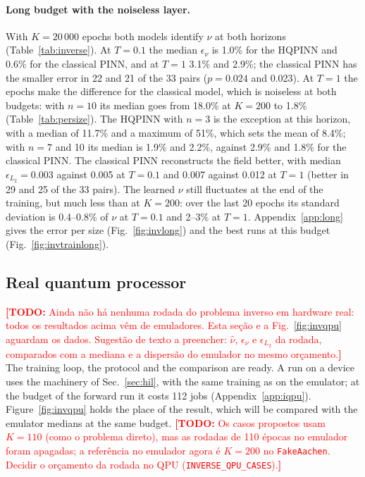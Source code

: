 \documentclass[floatfix,aps,pra,twocolumn,superscriptaddress,10pt,nofootinbib]{revtex4-2}
\newif\ifshowtodos \showtodostrue
\newcommand{\TODO}[1]{\ifshowtodos\textcolor{red}{\textbf{[TODO:} #1\textbf{]}}\fi}
\begin{document}
\paragraph{Long budget with the noiseless layer.} With $K=20\,000$ epochs both models identify $\nu$ at both horizons (Table~\ref{tab:inverse}). At $T=0.1$ the median $\epsilon_\nu$ is 1.0\% for the HQPINN and 0.6\% for the classical PINN, and at $T=1$ 3.1\% and 2.9\%; the classical PINN has the smaller error in 22 and 21 of the 33 pairs ($p=0.024$ and 0.023). At $T=1$ the epochs make the difference for the classical model, which is noiseless at both budgets: with $n=10$ its median goes from 18.0\% at $K=200$ to 1.8\% (Table~\ref{tab:persize}). The HQPINN with $n=3$ is the exception at this horizon, with a median of 11.7\% and a maximum of 51\%, which sets the mean of 8.4\%; with $n=7$ and 10 its median is 1.9\% and 2.2\%, against 2.9\% and 1.8\% for the classical PINN. The classical PINN reconstructs the field better, with median $\epsilon_{L_2}=0.003$ against 0.005 at $T=0.1$ and 0.007 against 0.012 at $T=1$ (better in 29 and 25 of the 33 pairs). The learned $\nu$ still fluctuates at the end of the training, but much less than at $K=200$: over the last 20 epochs its standard deviation is 0.4--0.8\% of $\nu$ at $T=0.1$ and 2--3\% at $T=1$. Appendix~\ref{app:long} gives the error per size (Fig.~\ref{fig:invlong}) and the best runs at this budget (Fig.~\ref{fig:invtrainlong}).

\subsection{Real quantum processor}\label{sec:i_qpu}
\TODO{Ainda n\~ao h\'a nenhuma rodada do problema inverso em hardware real: todos os resultados acima v\^em de emuladores. Esta se\c{c}\~ao e a Fig.~\ref{fig:invqpu} aguardam os dados. Sugest\~ao de texto a preencher: $\hat\nu$, $\epsilon_\nu$ e $\epsilon_{L_2}$ da rodada, comparados com a mediana e a dispers\~ao do emulador no mesmo or\c{c}amento.}
The training loop, the protocol and the comparison are ready. A run on a device uses the machinery of Sec.~\ref{sec:hil}, with the same training as on the emulator; at the budget of the forward run it costs 112 jobs (Appendix~\ref{app:iqpu}). Figure~\ref{fig:invqpu} holds the place of the result, which will be compared with the emulator medians at the same budget. \TODO{Os casos propostos usam $K=110$ (como o problema direto), mas as rodadas de 110 \'epocas no emulador foram apagadas; a refer\^encia no emulador agora \'e $K=200$ no \texttt{FakeAachen}. Decidir o or\c{c}amento da rodada no QPU (\texttt{INVERSE\_QPU\_CASES}).}
\end{document}
